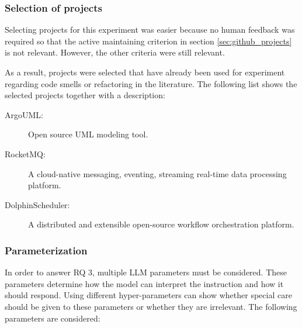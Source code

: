 \subsubsection{Selection of projects}

Selecting projects for this experiment was easier because no human feedback was required so that the active maintaining criterion in section \ref{sec:github_projects} is not relevant. However, the other criteria were still relevant. 

As a result, projects were selected that have already been used for experiment regarding code smells or refactoring in the literature. The following list shows the selected projects together with a description:
\begin{description}
    \item[ArgoUML:] Open source UML modeling tool. \cite{argouml}
    \item[RocketMQ:] A cloud-native messaging, eventing, streaming real-time data processing platform. \cite{rocketmq}
    \item[DolphinScheduler:] A distributed and extensible open-source workflow orchestration platform. \cite{dolphinscheduler}
\end{description}


\subsubsection{Parameterization}

In order to answer RQ 3, multiple \ac{LLM} parameters must be considered.  These parameters determine how the model can interpret the instruction and how it should respond. Using different hyper-parameters can show whether special care should be given to these parameters or whether they are irrelevant. The following parameters are considered: 

